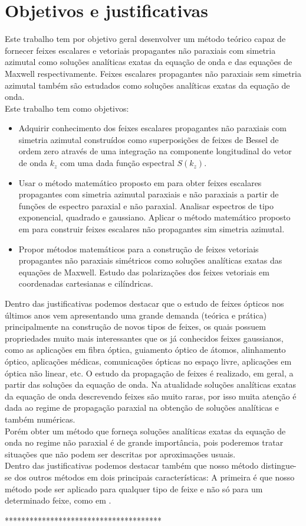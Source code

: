 \section{Objetivos e justificativas}
Este trabalho tem por objetivo geral desenvolver um método teórico capaz de fornecer feixes escalares e vetoriais propagantes não paraxiais com simetria azimutal como soluções analíticas exatas da equação de onda e das equações de Maxwell respectivamente. Feixes escalares propagantes não paraxiais sem simetria azimutal também são estudados como soluções analíticas exatas da equação de onda.\\
Este trabalho tem como objetivos:
\begin{itemize}
\item Adquirir conhecimento dos feixes escalares propagantes não paraxiais com simetria azimutal construídos como superposições de feixes de Bessel de ordem zero através de uma integração na componente longitudinal do vetor de onda $k_z$ com uma dada função espectral $S(k_z)$.
\item Usar o método matemático proposto em  para obter feixes escalares propagantes com simetria azimutal paraxiais e não paraxiais a partir de funções de espectro paraxial e não paraxial. Analisar espectros de tipo exponencial, quadrado e gaussiano. Aplicar o método matemático proposto em  para construir feixes escalares não propagantes sim simetria azimutal. 
\item Propor métodos matemáticos para a construção de feixes vetoriais propagantes não paraxiais simétricos como soluções analíticas exatas das equações de Maxwell. Estudo das polarizações dos feixes vetoriais em coordenadas cartesianas e cilíndricas.
\end{itemize}  
Dentro das justificativas podemos destacar que o estudo de feixes ópticos nos últimos anos vem apresentando uma grande demanda (teórica e prática) principalmente na construção de novos tipos de feixes, os quais possuem propriedades muito mais interessantes que os já conhecidos feixes gaussianos, como as aplicações em fibra óptica, guiamento óptico de átomos, alinhamento óptico, aplicações médicas, comunicações ópticas no espaço livre, aplicações em óptica não linear, etc. O estudo da propagação de feixes é realizado, em geral, a partir das soluções da equação de onda. Na atualidade soluções analíticas exatas da equação de onda descrevendo feixes são muito raras, por isso muita atenção é dada ao regime de propagação paraxial na obtenção de soluções analíticas e também numéricas.\\
Porém obter um método que forneça soluções analíticas exatas da equação de onda no regime não paraxial é de grande importância, pois poderemos tratar situações que não podem ser descritas por aproximações usuais.\\
Dentro das justificativas podemos destacar também que nosso método \cite{Stratton:02} distingue-se dos outros métodos em dois principais características: A primeira é que nosso método pode ser aplicado para qualquer tipo de feixe e não s\'o para um determinado feixe, como em \cite{Stratton:02, Jackson:03,Figueroa:05,Sochacki:1}.
  
************************************** 
